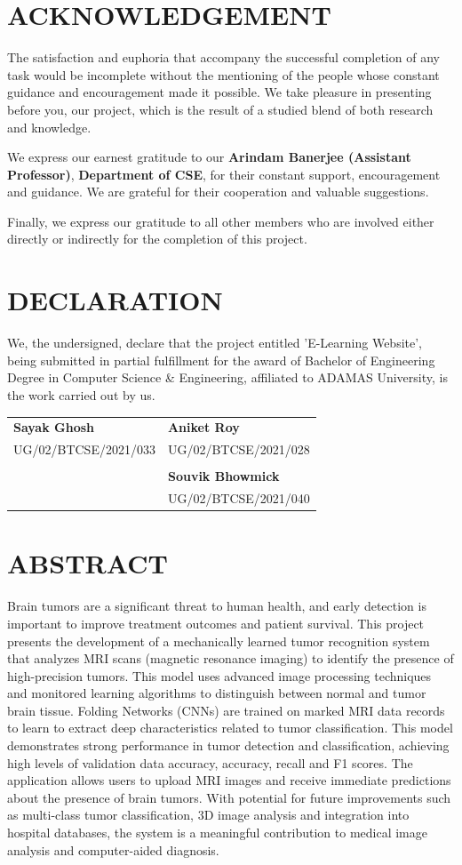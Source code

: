 \documentclass[BTech]{audiss}
\begin{document}
\section*{ACKNOWLEDGEMENT}
The satisfaction and euphoria that accompany the successful completion of any task would be incomplete without the mentioning of the people whose constant guidance and encouragement made it possible. We take pleasure in presenting before you, our project, which is the result of a studied blend of both research and knowledge.

We express our earnest gratitude to our \textbf{Arindam Banerjee (Assistant Professor)}, \textbf{Department of CSE}, for their constant support, encouragement and guidance. We are grateful for their cooperation and valuable suggestions.

Finally, we express our gratitude to all other members who are involved either directly or indirectly for the completion of this project.
\newpage
\section*{DECLARATION}
We, the undersigned, declare that the project entitled 'E-Learning Website', being submitted in partial fulfillment for the award of Bachelor of Engineering Degree in Computer Science \& Engineering, affiliated to ADAMAS University, is the work carried out by us.

\vspace{1cm}
\begin{tabular}{p{}p{}}
    \textbf{Sayak Ghosh} & \textbf{Aniket Roy}\\
    UG/02/BTCSE/2021/033 & UG/02/BTCSE/2021/028\\
    & \\
    & \textbf{Souvik Bhowmick}\\
    & UG/02/BTCSE/2021/040
\end{tabular}
\newpage
\section*{ABSTRACT}
Brain tumors are a significant threat to human health, and early detection is important to improve treatment outcomes and patient survival. This project presents the development of a mechanically learned tumor recognition system that analyzes MRI scans (magnetic resonance imaging) to identify the presence of high-precision tumors. This model uses advanced image processing techniques and monitored learning algorithms to distinguish between normal and tumor brain tissue. Folding Networks (CNNs) are trained on marked MRI data records to learn to extract deep characteristics related to tumor classification. This model demonstrates strong performance in tumor detection and classification, achieving high levels of validation data accuracy, accuracy, recall and F1 scores. The application allows users to upload MRI images and receive immediate predictions about the presence of brain tumors. With potential for future improvements such as multi-class tumor classification, 3D image analysis and integration into hospital databases, the system is a meaningful contribution to medical image analysis and computer-aided diagnosis.
\end{document}
